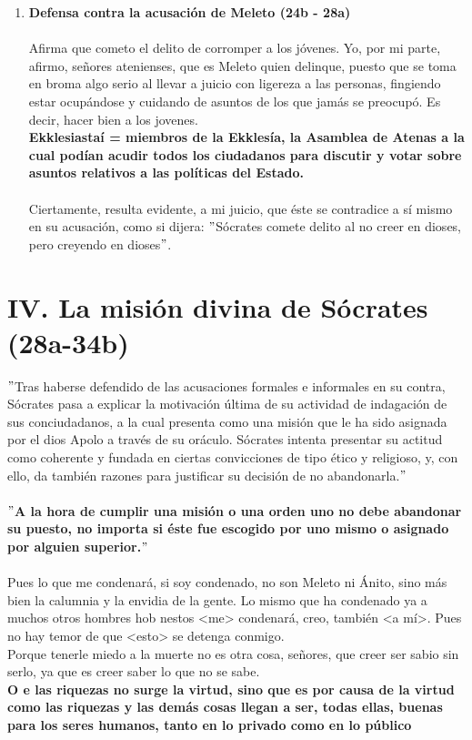 \begin{multicols}{2}
\begin{enumerate}[\bfseries 1.]
	\item \textbf{Defensa contra la acusación de Meleto (24b - 28a)}\\\\
	    Afirma que cometo el delito de corromper a los jóvenes. Yo, por mi parte, afirmo, señores atenienses, que es Meleto quien delinque, puesto que se toma en broma algo serio al llevar a juicio con ligereza a las personas, fingiendo estar ocupándose y cuidando de asuntos de los que jamás se preocupó. Es decir, hacer bien a los jovenes. \\
	    \textbf{Ekklesiastaí = miembros de la Ekklesía, la Asamblea de Atenas a la cual podían acudir todos los ciudadanos para discutir y votar sobre asuntos relativos a las políticas del Estado.}\\\\ 
	    Ciertamente, resulta evidente, a mi juicio, que éste se contradice a sí mismo en su acusación, como si dijera: $"$Sócrates comete delito al no creer en dioses, pero creyendo en dioses$"$.\\
    \end{enumerate}

\section*{\center IV. La misión divina de Sócrates (28a-34b)}
    $"$Tras haberse defendido de las acusaciones formales e informales en su contra, Sócrates pasa a explicar la motivación última de su actividad de indagación de sus conciudadanos, a la cual presenta como una misión que le ha sido asignada por el dios Apolo a través de su oráculo. Sócrates intenta presentar su actitud como coherente y fundada en ciertas convicciones de tipo ético y religioso, y, con ello, da también razones para justificar su decisión de no abandonarla.$"$\\\\

    \textbf{$"$A la hora de cumplir una misión o una orden uno no debe abandonar su puesto, no importa si éste fue escogido por uno mismo o asignado por alguien superior.$"$}\\\\

    Pues lo que me condenará, si soy condenado, no son Meleto ni Ánito, sino más bien la calumnia y la envidia de la gente. Lo mismo que ha condenado ya a muchos otros hombres hob nestos <me> condenará, creo, también <a mí>. Pues no hay temor de que <esto> se detenga conmigo.\\
     Porque tenerle miedo a la muerte no es otra cosa, señores, que creer ser sabio sin serlo, ya que es creer saber lo que no se sabe.\\
     \textbf{O e las riquezas no surge la virtud, sino que es por causa de la virtud como las riquezas y las demás cosas llegan a ser, todas ellas, buenas para los seres humanos, tanto en lo privado como en lo público}


\end{multicols}
